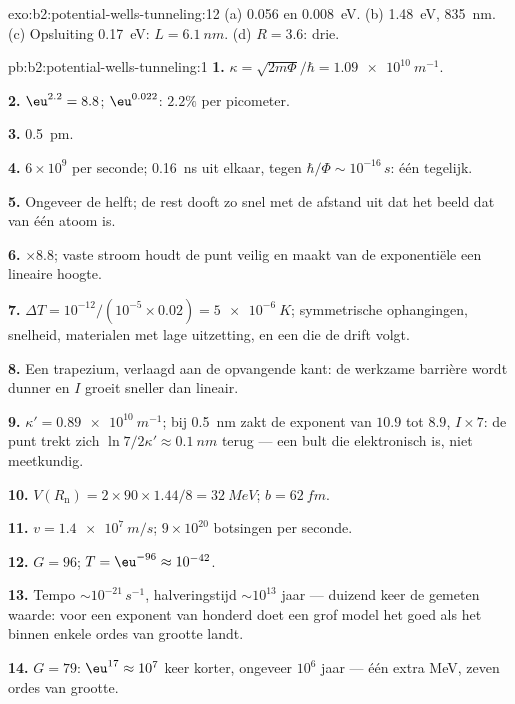 \begin{solution}{exo:b2:potential-wells-tunneling:12}
(a) \qty{0.056}{} en \qty{0.008}{eV}. (b) \qty{1.48}{eV}, \qty{835}{nm}. (c)
Opsluiting
\qty{0.17}{eV}: $L = \qty{6.1}{nm}$. (d) $R = 3.6$: drie.
\end{solution}

\begin{solution}{pb:b2:potential-wells-tunneling:1}
\textbf{1.} $\kappa = \sqrt{2m\Phi}/\hbar = \qty{1.09e10}{m^{-1}}$.

\textbf{2.} $\eu^{2.2} = 8.8$; $\eu^{0.022}$: $2.2\%$ per picometer.

\textbf{3.} \qty{0.5}{pm}.

\textbf{4.} $6 \times 10^9$ per seconde; \qty{0.16}{ns} uit elkaar, tegen
$\hbar/\Phi
\sim 10^{-16}\,\unit{s}$: één tegelijk.

\textbf{5.} Ongeveer de helft; de rest dooft zo snel met de afstand uit dat het
beeld dat van één atoom is.

\textbf{6.} $\times 8.8$; vaste stroom houdt de punt veilig en maakt van
de exponentiële een lineaire hoogte.

\textbf{7.} $\Delta T = 10^{-12}/(10^{-5} \times 0.02) = \qty{5e-6}{K}$;
symmetrische
ophangingen, snelheid, materialen met lage uitzetting, en een  die de
drift volgt.

\textbf{8.} Een trapezium, verlaagd aan de opvangende kant: de werkzame
barrière wordt dunner en $I$ groeit sneller dan lineair.

\textbf{9.} $\kappa' = \qty{0.89e10}{m^{-1}}$; bij \qty{0.5}{nm} zakt de
exponent van
$10.9$ tot $8.9$, $I \times 7$: de punt trekt zich
$\ln 7/2\kappa' \approx \qty{0.1}{nm}$ terug
--- een bult die elektronisch is, niet meetkundig.

\textbf{10.} $V(R_{\text{n}}) = 2 \times 90 \times 1.44/8 = \qty{32}{MeV}$;
$b = \qty{62}{fm}$.

\textbf{11.} $v = \qty{1.4e7}{m/s}$; $9 \times 10^{20}$ botsingen per seconde.

\textbf{12.} $G = 96$; $T = \eu^{-96} \approx 10^{-42}$.

\textbf{13.} Tempo $\sim 10^{-21}\,\unit{s^{-1}}$, halveringstijd
$\sim 10^{13}$ jaar --- duizend
keer de gemeten waarde: voor een exponent van honderd doet een
grof model het goed als het binnen enkele ordes van grootte landt.

\textbf{14.} $G = 79$: $\eu^{17} \approx 10^7$ keer korter, ongeveer $10^6$ jaar ---
één extra MeV, zeven ordes van grootte.


\end{solution}

